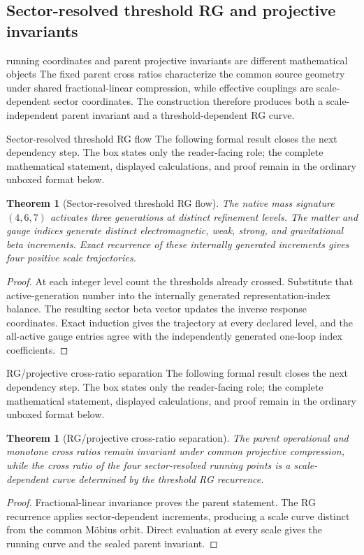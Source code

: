 \documentclass[11pt]{article}
\numberwithin{equation}{section}
\newtheorem{theorem}[definition]{Theorem}
\theoremstyle{remark}
\begin{document}
\subsection{Sector-resolved threshold RG and projective invariants}
\begin{conceptledger}{running coordinates and parent projective invariants are different mathematical objects}
The fixed parent cross ratios characterize the common source geometry under shared fractional-linear compression, while effective couplings are scale-dependent sector coordinates. The construction therefore produces both a scale-independent parent invariant and a threshold-dependent RG curve.
\end{conceptledger}
\begin{proofguide}{Sector-resolved threshold RG flow}
The following formal result closes the next dependency step. The box states only the reader-facing role; the complete mathematical statement, displayed calculations, and proof remain in the ordinary unboxed format below.
\end{proofguide}
\begin{theorem}[Sector-resolved threshold RG flow]
The native mass signature $(4,6,7)$ activates three generations at distinct refinement levels. The matter and gauge indices generate distinct electromagnetic, weak, strong, and gravitational beta increments. Exact recurrence of these internally generated increments gives four positive scale trajectories.
\end{theorem}
\begin{proof}
At each integer level count the thresholds already crossed. Substitute that active-generation number into the internally generated representation-index balance. The resulting sector beta vector updates the inverse response coordinates. Exact induction gives the trajectory at every declared level, and the all-active gauge entries agree with the independently generated one-loop index coefficients.
\end{proof}
\begin{proofguide}{RG/projective cross-ratio separation}
The following formal result closes the next dependency step. The box states only the reader-facing role; the complete mathematical statement, displayed calculations, and proof remain in the ordinary unboxed format below.
\end{proofguide}
\begin{theorem}[RG/projective cross-ratio separation]
The parent operational and monotone cross ratios remain invariant under common projective compression, while the cross ratio of the four sector-resolved running points is a scale-dependent curve determined by the threshold RG recurrence.
\end{theorem}
\begin{proof}
Fractional-linear invariance proves the parent statement. The RG recurrence applies sector-dependent increments, producing a scale curve distinct from the common Möbius orbit. Direct evaluation at every scale gives the running curve and the sealed parent invariant.
\end{proof}
\end{document}
